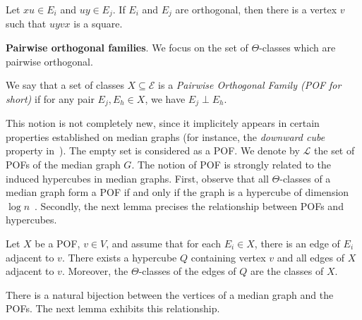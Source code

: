 \documentclass[a4paper,UKenglish,numberwithinsect,cleveref, autoref]{lipics-v2021}
\begin{document}
\begin{lemma}
Let $xu \in E_i$ and $uy \in E_j$. If $E_i$ and $E_j$ are orthogonal, then there is a vertex $v$ such that $uyvx$ is a square.
\label{le:squares}
\end{lemma}

\textbf{Pairwise orthogonal families}. We focus on the set of $\Theta$-classes which are pairwise orthogonal.

\begin{definition}
We say that a set of classes $X \subseteq \mathcal{E}$ is a {\em Pairwise Orthogonal Family (POF for short)} if for any pair $E_j,E_h \in X$, we have $E_j \perp E_h$.
\end{definition}

This notion is not completely new, since it implicitely appears in certain properties established on median graphs (for instance, the \textit{downward cube} property in~\cite{BeChChVa20}). The empty set is considered as a POF. We denote by $\mathcal{L}$ the set of POFs of the median graph $G$. The notion of POF is strongly related to the induced hypercubes in median graphs. First, observe that all $\Theta$-classes of a median graph form a POF if and only if the graph is a hypercube of dimension $\log n$~\cite{Ko09,MoMuRo98}. Secondly, the next lemma precises the relationship  between POFs and hypercubes.


\begin{lemma}
Let $X$ be a POF, $v \in V$, and assume that for each $E_i \in X$, there is an edge of $E_i$ adjacent to $v$. There exists a hypercube $Q$ containing vertex $v$ and all edges of $X$ adjacent to $v$. Moreover, the $\Theta$-classes of the edges of $Q$ are the classes of $X$.
\label{le:pof_adjacent}
\end{lemma}

There is a natural bijection between the vertices of a median graph and the POFs. The next lemma exhibits this relationship.
\end{document}
